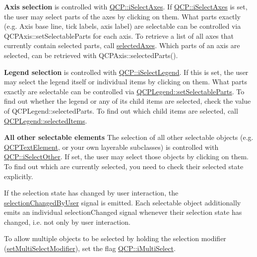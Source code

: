 {\bfseries Axis selection} is controlled with \hyperlink{namespace_q_c_p_a2ad6bb6281c7c2d593d4277b44c2b037a7f49c26c8cf12373ac867d63737c62b9}{Q\+C\+P\+::i\+Select\+Axes}. If \hyperlink{namespace_q_c_p_a2ad6bb6281c7c2d593d4277b44c2b037a7f49c26c8cf12373ac867d63737c62b9}{Q\+C\+P\+::i\+Select\+Axes} is set, the user may select parts of the axes by clicking on them. What parts exactly (e.\+g. Axis base line, tick labels, axis label) are selectable can be controlled via Q\+C\+P\+Axis\+::set\+Selectable\+Parts for each axis. To retrieve a list of all axes that currently contain selected parts, call \hyperlink{class_q_custom_plot_aa6baf867e8beb96ed5bd471f83ece903}{selected\+Axes}. Which parts of an axis are selected, can be retrieved with Q\+C\+P\+Axis\+::selected\+Parts().

{\bfseries Legend selection} is controlled with \hyperlink{namespace_q_c_p_a2ad6bb6281c7c2d593d4277b44c2b037a2b0800bffd93fc13090670eabf0fe1db}{Q\+C\+P\+::i\+Select\+Legend}. If this is set, the user may select the legend itself or individual items by clicking on them. What parts exactly are selectable can be controlled via \hyperlink{class_q_c_p_legend_a9ce60aa8bbd89f62ae4fa83ac6c60110}{Q\+C\+P\+Legend\+::set\+Selectable\+Parts}. To find out whether the legend or any of its child items are selected, check the value of Q\+C\+P\+Legend\+::selected\+Parts. To find out which child items are selected, call \hyperlink{class_q_c_p_legend_ac93eaf236e911d67aa8b88942ef45c5e}{Q\+C\+P\+Legend\+::selected\+Items}.

{\bfseries All other selectable elements} The selection of all other selectable objects (e.\+g. \hyperlink{class_q_c_p_text_element}{Q\+C\+P\+Text\+Element}, or your own layerable subclasses) is controlled with \hyperlink{namespace_q_c_p_a2ad6bb6281c7c2d593d4277b44c2b037a2ba96f62595bc22603da0e575b589a83}{Q\+C\+P\+::i\+Select\+Other}. If set, the user may select those objects by clicking on them. To find out which are currently selected, you need to check their selected state explicitly.

If the selection state has changed by user interaction, the \hyperlink{class_q_custom_plot_a500c64a109bc773c973ad274f2fa4190}{selection\+Changed\+By\+User} signal is emitted. Each selectable object additionally emits an individual selection\+Changed signal whenever their selection state has changed, i.\+e. not only by user interaction.

To allow multiple objects to be selected by holding the selection modifier (\hyperlink{class_q_custom_plot_a8fc96e3b5138a06759a2a90c166df516}{set\+Multi\+Select\+Modifier}), set the flag \hyperlink{namespace_q_c_p_a2ad6bb6281c7c2d593d4277b44c2b037ad0378264fda468cecdab409dde4542ad}{Q\+C\+P\+::i\+Multi\+Select}.

